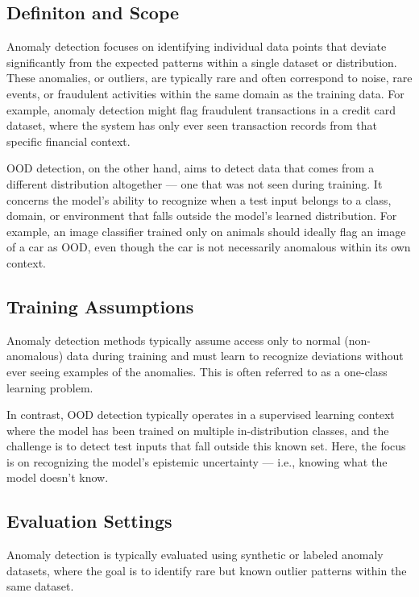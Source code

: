 \documentclass[11pt, oneside]{book}
\theoremstyle{plain}
\theoremstyle{definition}
\theoremstyle{remark}
\begin{document}
\subsection{Definiton and Scope}

Anomaly detection focuses on identifying individual data points that deviate significantly from the expected patterns within a single dataset or distribution. These anomalies, or outliers, are typically rare and often correspond to noise, rare events, or fraudulent activities within the same domain as the training data. For example, anomaly detection might flag fraudulent transactions in a credit card dataset, where the system has only ever seen transaction records from that specific financial context.

OOD detection, on the other hand, aims to detect data that comes from a different distribution altogether — one that was not seen during training. It concerns the model’s ability to recognize when a test input belongs to a class, domain, or environment that falls outside the model’s learned distribution. For example, an image classifier trained only on animals should ideally flag an image of a car as OOD, even though the car is not necessarily anomalous within its own context.

\subsection{Training Assumptions}

Anomaly detection methods typically assume access only to normal (non-anomalous) data during training and must learn to recognize deviations without ever seeing examples of the anomalies. This is often referred to as a one-class learning problem.

In contrast, OOD detection typically operates in a supervised learning context where the model has been trained on multiple in-distribution classes, and the challenge is to detect test inputs that fall outside this known set. Here, the focus is on recognizing the model’s epistemic uncertainty — i.e., knowing what the model doesn’t know.

\subsection{Evaluation Settings}

Anomaly detection is typically evaluated using synthetic or labeled anomaly datasets, where the goal is to identify rare but known outlier patterns within the same dataset.
\end{document}
